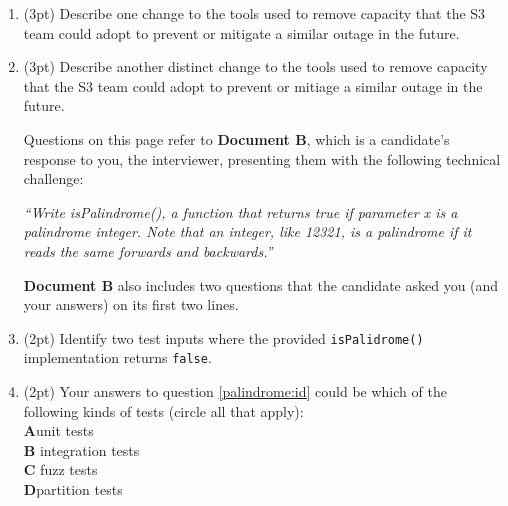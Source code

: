 \documentclass{report}
\newif\ifkey
\newcommand{\correct}[1]{\ifkey\color{red}\textbf{#1}\color{black}\else\textbf{#1}\fi\xspace}
\newcommand{\answerlong}[1]{\ifkey\color{red}\textbf{#1}\color{black}\else\vspace{0.5in}\fi\xspace}
\newcommand*{\pts}[1]{\addtocounter{points}{#1}(#1pt)}
\begin{document}
\begin{spacing}{1.4}
\begin{enumerate}[leftmargin=*]
    \item \pts{3} Describe one change to the tools used to remove capacity that the S3 team could adopt to prevent or mitigate
      a similar outage in the future. \\
      \answerlong{Either of the following two answers, which S3 itself gives in the full postmortem, is acceptable. Other
        sensible answers may also get credit or partial credit. 1) modify the tool to remove capacity more slowly, or
        2) add safeguards to prevent capacity from being removed when it will take any subsystem below its minimum required capacity level}

    \item \pts{3} Describe another distinct change to the tools used to remove capacity that the S3 team could adopt to prevent
      or mitiage a similar outage in the future. \\
      \answerlong{See the previous question.}
      
    \newpage

    Questions on this page refer to \textbf{Document B}, which is a candidate's response to you,
    the interviewer, presenting them with the following technical challenge:

    \emph{
      ``Write isPalindrome(), a function that
      returns true if parameter x is a palindrome integer. Note that an integer, like 12321, is a palindrome if it reads the same
      forwards and backwards.''
    }
      
    \textbf{Document B} also includes two questions that the candidate asked you (and your answers) on its first two lines.

  \item \label{palindrome:id} \pts{2} Identify two test inputs where the provided \lstinline{isPalidrome()} implementation returns \lstinline{false}.\\
    \answerlong{Answers will vary. Student solutions must not be a palindrome. {{123}}, {{10}} are potential answers that return
      false.}

  \item \pts{2} Your answers to question \ref{palindrome:id} could be which of the following kinds of tests (circle all that apply):
    \\ \correct{A}\hspace{0.2in}unit tests
    \\ \textbf{B}\hspace{0.2in} integration tests
    \\ \textbf{C}\hspace{0.2in} fuzz tests
    \\ \correct{D}\hspace{0.2in}partition tests


\end{enumerate}
\end{spacing}
\end{document}
